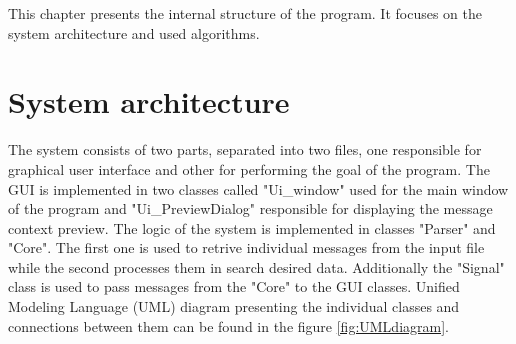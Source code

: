 \documentclass[a4paper,twoside,12pt]{book}
\begin{document}
This chapter presents the internal structure of the program. It focuses on the system architecture and used algorithms.


\section{System architecture}

The system consists of two parts, separated into two files, one responsible for graphical user interface and other for
performing the goal of the program. The GUI is implemented in two classes called "Ui\_window" used for the main window of the program and "Ui\_PreviewDialog" responsible for displaying 
the message context preview. The logic of the system is implemented in classes "Parser" and "Core". The first one is used to retrive individual messages from the input file while the second
processes them in search desired data. Additionally the "Signal" class is used to pass messages from the "Core" to the GUI classes. Unified Modeling Language (UML) diagram presenting the 
individual classes and connections between them can be found in the figure \ref{fig:UMLdiagram}.
\end{document}
